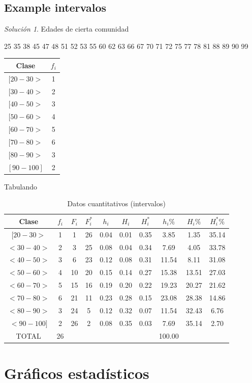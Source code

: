 \documentclass[10pt,]{krantz}
\theoremstyle{definition}
\theoremstyle{definition}
\theoremstyle{definition}
\theoremstyle{definition}
\theoremstyle{remark}
\newtheorem*{solution}{Solución}
\begin{document}
\hypertarget{example-intervalos}{%
\section{Example intervalos}\label{example-intervalos}}

\begin{solution}
{}
Edades de cierta comunidad

25
35 38
45 47 48
51 52 53 55
60 62 63 66 67
70 71 72 75 77 78
81 88 89
90 99

\begin{longtable}[]{@{}cc@{}}
\toprule
Clase & \(f_i\)\tabularnewline
\midrule
\endhead
\([20-30>\) & 1\tabularnewline
\([30-40>\) & 2\tabularnewline
\([40-50>\) & 3\tabularnewline
\([50-60>\) & 4\tabularnewline
\([60-70>\) & 5\tabularnewline
\([70-80>\) & 6\tabularnewline
\([80-90>\) & 3\tabularnewline
\([90-100]\) & 2\tabularnewline
\bottomrule
\end{longtable}
\end{solution}

Tabulando

\begin{longtable}[t]{cccccccccc}
\caption{\label{tab:cuantitativa}Datos cuantitativos (intervalos)}\\
\toprule
Clase & $f_i$ & $F_i$ & $F_i^*$ & $h_i$ & $H_i$ & $H_i^*$ & $h_i\%$ & $H_i\%$ & $H_i^*\%$\\
\midrule
$[20-30>$ & 1 & 1 & 26 & 0.04 & 0.01 & 0.35 & 3.85 & 1.35 & 35.14\\
$<30-40>$ & 2 & 3 & 25 & 0.08 & 0.04 & 0.34 & 7.69 & 4.05 & 33.78\\
$<40-50>$ & 3 & 6 & 23 & 0.12 & 0.08 & 0.31 & 11.54 & 8.11 & 31.08\\
$<50-60>$ & 4 & 10 & 20 & 0.15 & 0.14 & 0.27 & 15.38 & 13.51 & 27.03\\
$<60-70>$ & 5 & 15 & 16 & 0.19 & 0.20 & 0.22 & 19.23 & 20.27 & 21.62\\
$<70-80>$ & 6 & 21 & 11 & 0.23 & 0.28 & 0.15 & 23.08 & 28.38 & 14.86\\
$<80-90>$ & 3 & 24 & 5 & 0.12 & 0.32 & 0.07 & 11.54 & 32.43 & 6.76\\
$<90-100]$ & 2 & 26 & 2 & 0.08 & 0.35 & 0.03 & 7.69 & 35.14 & 2.70\\
TOTAL & 26 &  &  &  &  &  & 100.00 &  & \\
\bottomrule
\end{longtable}

\hypertarget{gruxe1ficos-estaduxedsticos}{%
\chapter{Gráficos estadísticos}\label{gruxe1ficos-estaduxedsticos}}
\end{document}
